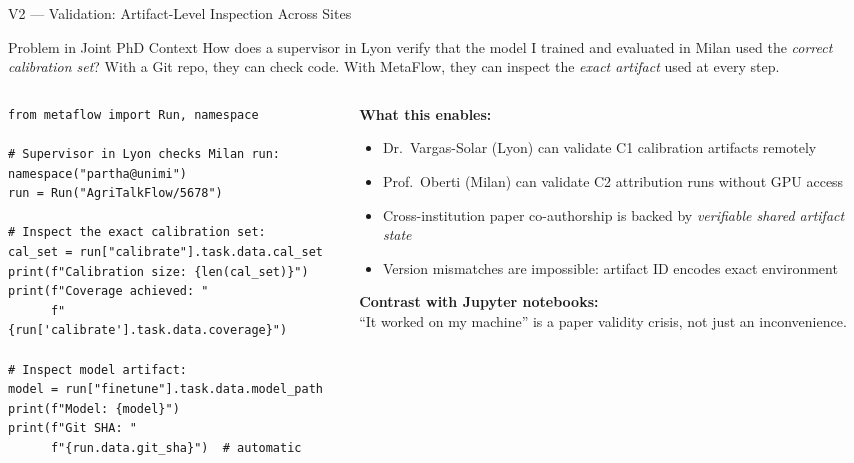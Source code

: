 \documentclass[10pt,aspectratio=169]{beamer}
\begin{document}
\begin{frame}[fragile]{V2 --- Validation: Artifact-Level Inspection Across Sites}

\begin{block}{Problem in Joint PhD Context}
\small How does a supervisor in Lyon verify that the model I trained
and evaluated in Milan used the \emph{correct calibration set}?
With a Git repo, they can check code. With MetaFlow, they can inspect the \emph{exact artifact} used at every step.
\end{block}

\begin{columns}
\begin{column}{0.54\textwidth}
\begin{lstlisting}[title={\scriptsize Cross-site validation (Lyon + Milan)}]
from metaflow import Run, namespace

# Supervisor in Lyon checks Milan run:
namespace("partha@unimi")
run = Run("AgriTalkFlow/5678")

# Inspect the exact calibration set:
cal_set = run["calibrate"].task.data.cal_set
print(f"Calibration size: {len(cal_set)}")
print(f"Coverage achieved: "
      f"{run['calibrate'].task.data.coverage}")

# Inspect model artifact:
model = run["finetune"].task.data.model_path
print(f"Model: {model}")
print(f"Git SHA: "
      f"{run.data.git_sha}")  # automatic
\end{lstlisting}
\end{column}
\begin{column}{0.43\textwidth}
\small
\textbf{What this enables:}
\begin{itemize}
  \item Dr.\ Vargas-Solar (Lyon) can validate C1 calibration artifacts remotely
  \item Prof.\ Oberti (Milan) can validate C2 attribution runs without GPU access
  \item Cross-institution paper co-authorship is backed by \emph{verifiable shared artifact state}
  \item Version mismatches are impossible: artifact ID encodes exact environment
\end{itemize}
\vspace{0.2cm}
\textbf{Contrast with Jupyter notebooks:}\\
``It worked on my machine'' is a paper validity crisis, not just an inconvenience.
\end{column}
\end{columns}

\end{frame}
\end{document}
